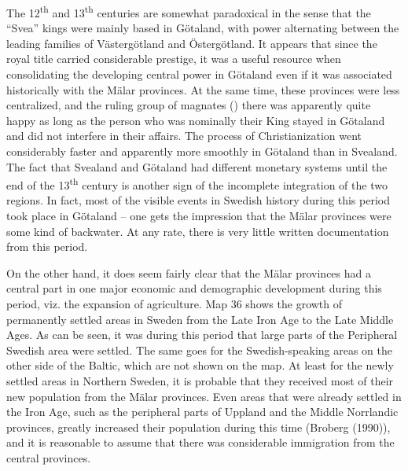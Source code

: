 The 12\textsuperscript{th} and 13\textsuperscript{th} centuries are somewhat paradoxical in the sense that the “Svea” kings were mainly based in Götaland, with power alternating between the leading families of Västergötland and Östergötland. It appears that since the royal title carried considerable prestige, it was a useful resource when consolidating the developing central power in Götaland even if it was associated historically with the Mälar provinces. At the same time, these provinces were less centralized, and the ruling group of magnates () there was apparently quite happy as long as the person who was nominally their King stayed in Götaland and did not interfere in their affairs. The process of Christianization went considerably faster and apparently more smoothly in Götaland than in Svealand. The fact that Svealand and Götaland had different monetary systems until the end of the 13\textsuperscript{th} century is another sign of the incomplete integration of the two regions. In fact, most of the visible events in Swedish history during this period took place in Götaland – one gets the impression that the Mälar provinces were some kind of backwater. At any rate, there is very little written documentation from this period. 

On the other hand, it does seem fairly clear that the Mälar provinces had a central part in one major economic and demographic development during this period, viz. the expansion of agriculture. Map 36 shows the growth of permanently settled areas in Sweden from the Late Iron Age to the Late Middle Ages. As can be seen, it was during this period that large parts of the Peripheral Swedish area were settled. The same goes for the Swedish-speaking areas on the other side of the Baltic, which are not shown on the map. At least for the newly settled areas in Northern Sweden, it is probable that they received most of their new population from the Mälar provinces. Even areas that were already settled in the Iron Age, such as the peripheral parts of Uppland and the Middle Norrlandic provinces, greatly increased their population during this time (Broberg (1990)), and it is reasonable to assume that there was considerable immigration from the central provinces. 

